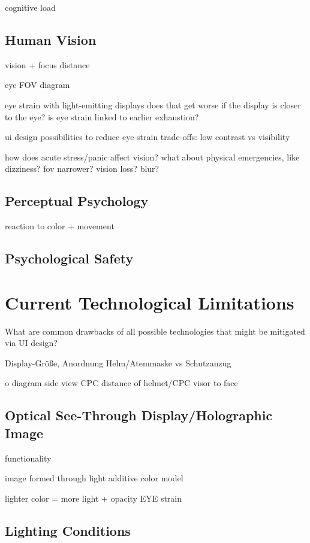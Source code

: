 cognitive load

\subsection{Human Vision}

vision + focus distance

eye FOV diagram

eye strain with light-emitting displays
does that get worse if the display is closer to the eye?
is eye strain linked to earlier exhaustion?

ui design possibilities to reduce eye strain
trade-offs: low contrast vs visibility

how does acute stress/panic affect vision? what about physical emergencies, like dizziness? fov narrower? vision loss? blur?

\subsection{Perceptual Psychology}

reaction to color + movement

\subsection{Psychological Safety}

\section{Current Technological Limitations}

What are common drawbacks of all possible technologies that might be mitigated via UI design?

Display-Größe, Anordnung
Helm/Atemmaske vs Schutzanzug

o diagram side view CPC
distance of helmet/CPC visor to face

\subsection{Optical See-Through Display/Holographic Image}

functionality

image formed through light
additive color model

lighter color = more light + opacity
EYE strain

\subsection{Lighting Conditions}

